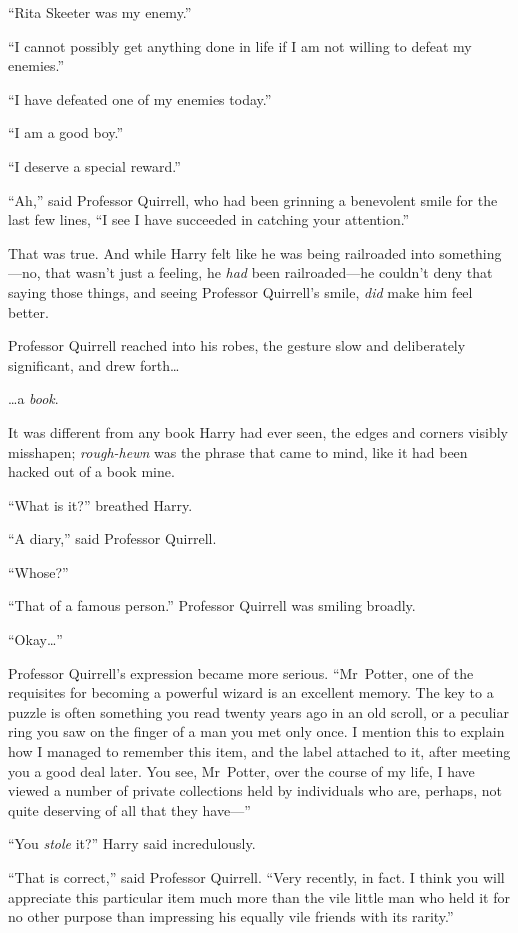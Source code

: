 “Rita Skeeter was my enemy.”

“I cannot possibly get anything done in life if I am not willing to defeat my enemies.”

“I have defeated one of my enemies today.”

“I am a good boy.”

“I deserve a special reward.”

“Ah,” said Professor Quirrell, who had been grinning a benevolent smile for the last few lines,
“I see I have succeeded in catching your attention.”

That was true. And while Harry felt like he was being railroaded into something—no, that wasn’t just a feeling, he \emph{had} been railroaded—he couldn’t deny that saying those things, and seeing Professor Quirrell’s smile, \emph{did} make him feel better.

Professor Quirrell reached into his robes, the gesture slow and deliberately significant, and drew forth…

…a \emph{book}.

It was different from any book Harry had ever seen, the edges and corners visibly misshapen; \emph{rough-hewn} was the phrase that came to mind, like it had been hacked out of a book mine.

“What is it?” breathed Harry.

“A diary,” said Professor Quirrell.

“Whose?”

“That of a famous person.” Professor Quirrell was smiling broadly.

“Okay…”

Professor Quirrell’s expression became more serious.
“Mr~Potter, one of the requisites for becoming a powerful wizard is an excellent memory. The key to a puzzle is often something you read twenty years ago in an old scroll, or a peculiar ring you saw on the finger of a man you met only once. I mention this to explain how I managed to remember this item, and the label attached to it, after meeting you a good deal later. You see, Mr~Potter, over the course of my life, I have viewed a number of private collections held by individuals who are, perhaps, not quite deserving of all that they have—”

“You \emph{stole} it?” Harry said incredulously.

“That is correct,” said Professor Quirrell.
“Very recently, in fact. I think you will appreciate this particular item much more than the vile little man who held it for no other purpose than impressing his equally vile friends with its rarity.”

